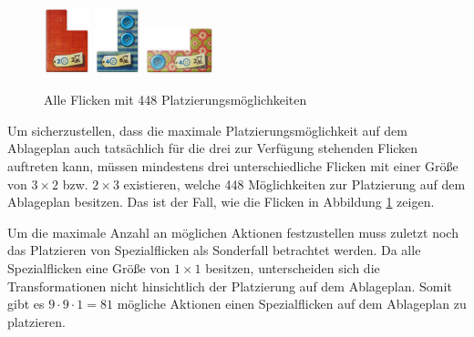 \begin{figure}
    \vspace*{-0.1cm}
    \centering
    \includegraphics[width=0.12\textwidth]{res/pictures/assets/08-front.png}

    \includegraphics[width=0.12\textwidth]{res/pictures/assets/14-front.png}

    \includegraphics[width=0.18\textwidth]{res/pictures/assets/19-front.png}
    \caption[Alle Flicken mit 448 Platzierungsmöglichkeiten]{\unskip}
    Alle Flicken mit 448 Platzierungsmöglichkeiten
    \label{fig:flicken-mit-448}
    \vspace*{-0.1cm}
\end{figure}

Um sicherzustellen, dass die maximale Platzierungsmöglichkeit auf dem Ablageplan auch tatsächlich für die drei zur Verfügung stehenden Flicken auftreten kann, müssen mindestens drei unterschiedliche Flicken mit einer Größe von $3 \times 2$ bzw. $2 \times 3$ existieren, welche 448 Möglichkeiten zur Platzierung auf dem Ablageplan besitzen. Das ist der Fall, wie die Flicken in Abbildung \ref{fig:flicken-mit-448} zeigen.

Um die maximale Anzahl an möglichen Aktionen festzustellen muss zuletzt noch das Platzieren von Spezialflicken als Sonderfall betrachtet werden. Da alle Spezialflicken eine Größe von $1 \times 1$ besitzen, unterscheiden sich die Transformationen nicht hinsichtlich der Platzierung auf dem Ablageplan. Somit gibt es $9 \cdot 9 \cdot 1 = 81$ mögliche Aktionen einen Spezialflicken auf dem Ablageplan zu platzieren.

